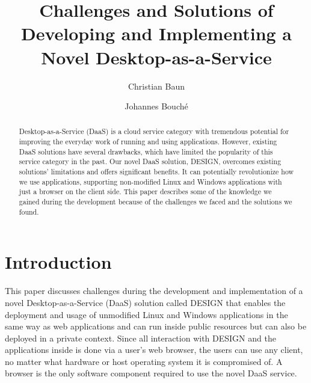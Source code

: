 \documentclass[runningheads]{llncs}
\begin{document}
%
\title{Challenges and Solutions of Developing and
	Implementing a Novel Desktop-as-a-Service}
%
%
\author{Christian Baun \and
	Johannes Bouché}
%
%
%
\maketitle              %
%
\begin{abstract}
Desktop-as-a-Service (DaaS) is a cloud service category with tremendous potential for improving the everyday work of running and using applications. However, existing DaaS solutions have several drawbacks, which have limited the popularity of this service category in the past. Our novel DaaS solution, DESIGN, overcomes existing solutions' limitations and offers significant benefits. It can potentially revolutionize how we use applications, supporting non-modified Linux and Windows applications with just a browser on the client side. This paper describes some of the knowledge we gained during the development because of the challenges we faced and the solutions we found.

\end{abstract}
%
%
%
\section{Introduction}


This paper discusses challenges during the development and implementation of a novel Desktop-as-a-Service (DaaS) solution called DESIGN that enables the deployment and usage of unmodified Linux and Windows applications in the same way as web applications and can run inside public resources but can also be deployed in a private context. Since all interaction with DESIGN and the applications inside is done via a user's web browser, the users can use any client, no matter what hardware or host operating system it is compromised of. A browser is the only software component required to use the novel DaaS service.
\end{document}
